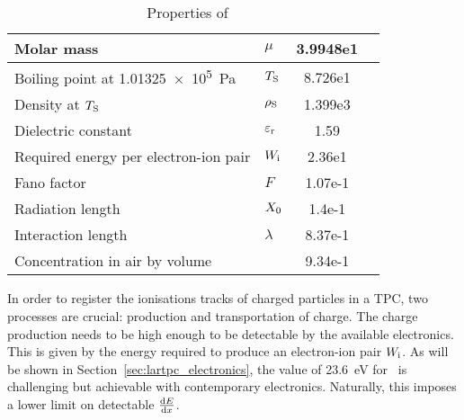 \begin{table}[htb]
	\centering
	\caption{Properties of \lar~\cite{NobleGasDetectors}}
	\label{tab:lartpc_larprop}
	\begin{tabu} to \textwidth {|ll|Ss|}
		\hline
		{Molar mass} &									$\mu$ &					3.9948e1 &	\gram\per\mol \\
		\hline
		{Boiling point at} \SI{1.01325e5}{\pascal} &	$T_{\mathrm{S}}$ &			8.726e1 &	\kelvin \\
		\hline
		{Density at} $T_{\mathrm{S}}$ &						$\rho_{\mathrm{S}}$ &		1.399e3 &	\kilo\gram\per\cubic\metre \\
		\hline
		{Dielectric constant} &							$\varepsilon_{\mathrm{r}}$ &	1.59 &		\\
		\hline
		{Required energy per electron-ion pair} &		$W_{\mathrm{i}}$ &			2.36e1 &	\electronvolt \\
		\hline
		{Fano factor} &									$F$ &					1.07e-1 &	\\
		\hline
		{Radiation length} &							$X_{\mathrm{0}}$ &			1.4e-1 &		\metre \\
		\hline
		{Interaction length} &							$\lambda$ &				8.37e-1 &	\metre \\
		\hline
		{Concentration in air by volume} &				&						9.34e-1 &	\percent \\
		\hline
	\end{tabu}
\end{table}

In order to register the ionisations tracks of charged particles in a TPC, two processes are crucial: production and transportation of charge.
The charge production needs to be high enough to be detectable by the available electronics.
This is given by the energy required to produce an electron-ion pair $W_{\mathrm{i}}$.
As will be shown in Section~\ref{sec:lartpc_electronics}, the value of \SI{23.6}{\electronvolt} for \lar\ is challenging but achievable with contemporary electronics.
Naturally, this imposes a lower limit on detectable $\frac{\mathrm{d}E}{\mathrm{d}x}$.

